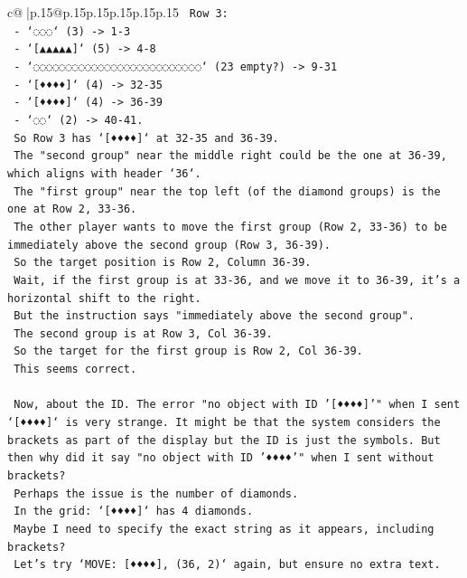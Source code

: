 \documentclass{article}
\begin{document}
{\begin{supertabular}{c@{$\;$}|p{.15\linewidth}@{}p{.15\linewidth}p{.15\linewidth}p{.15\linewidth}p{.15\linewidth}p{.15\linewidth}}
{{{\texttt{    Row 3:} \\
\texttt{    {-} `◌◌◌` (3) {-}> 1{-}3} \\
\texttt{    {-} `{[}▲▲▲▲▲{]}` (5) {-}> 4{-}8} \\
\texttt{    {-} `◌◌◌◌◌◌◌◌◌◌◌◌◌◌◌◌◌◌◌◌◌◌◌◌◌◌` (23 empty?) {-}> 9{-}31} \\
\texttt{    {-} `{[}♦♦♦♦{]}` (4) {-}> 32{-}35} \\
\texttt{    {-} `{[}♦♦♦♦{]}` (4) {-}> 36{-}39} \\
\texttt{    {-} `◌◌` (2) {-}> 40{-}41.} \\
\texttt{    So Row 3 has `{[}♦♦♦♦{]}` at 32{-}35 and 36{-}39.} \\
\texttt{    The "second group" near the middle right could be the one at 36{-}39, which aligns with header `36`.} \\
\texttt{    The "first group" near the top left (of the diamond groups) is the one at Row 2, 33{-}36.} \\
\texttt{    The other player wants to move the first group (Row 2, 33{-}36) to be immediately above the second group (Row 3, 36{-}39).} \\
\texttt{    So the target position is Row 2, Column 36{-}39.} \\
\texttt{    Wait, if the first group is at 33{-}36, and we move it to 36{-}39, it's a horizontal shift to the right.} \\
\texttt{    But the instruction says "immediately above the second group".} \\
\texttt{    The second group is at Row 3, Col 36{-}39.} \\
\texttt{    So the target for the first group is Row 2, Col 36{-}39.} \\
\texttt{    This seems correct.} \\
\\ 
\texttt{    Now, about the ID. The error "no object with ID '{[}♦♦♦♦{]}'" when I sent `{[}♦♦♦♦{]}` is very strange. It might be that the system considers the brackets as part of the display but the ID is just the symbols. But then why did it say "no object with ID '♦♦♦♦'" when I sent without brackets?} \\
\texttt{    Perhaps the issue is the number of diamonds.} \\
\texttt{    In the grid: `{[}♦♦♦♦{]}` has 4 diamonds.} \\
\texttt{    Maybe I need to specify the exact string as it appears, including brackets?} \\
\texttt{    Let's try `MOVE: {[}♦♦♦♦{]}, (36, 2)` again, but ensure no extra text.} \\
}}}
\end{supertabular}}
\end{document}

